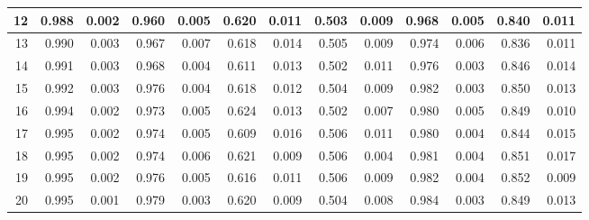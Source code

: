 \documentclass[
]{article}
\begin{document}
\begin{table}[H]
{\begin{tabular}[t]{r|r|r|r|r|r|r|r|r|r|r|r|r}
\hline
12 & 0.988 & 0.002 & 0.960 & 0.005 & 0.620 & 0.011 & 0.503 & 0.009 & 0.968 & 0.005 & 0.840 & 0.011\\
\hline
13 & 0.990 & 0.003 & 0.967 & 0.007 & 0.618 & 0.014 & 0.505 & 0.009 & 0.974 & 0.006 & 0.836 & 0.011\\
\hline
14 & 0.991 & 0.003 & 0.968 & 0.004 & 0.611 & 0.013 & 0.502 & 0.011 & 0.976 & 0.003 & 0.846 & 0.014\\
\hline
15 & 0.992 & 0.003 & 0.976 & 0.004 & 0.618 & 0.012 & 0.504 & 0.009 & 0.982 & 0.003 & 0.850 & 0.013\\
\hline
16 & 0.994 & 0.002 & 0.973 & 0.005 & 0.624 & 0.013 & 0.502 & 0.007 & 0.980 & 0.005 & 0.849 & 0.010\\
\hline
17 & 0.995 & 0.002 & 0.974 & 0.005 & 0.609 & 0.016 & 0.506 & 0.011 & 0.980 & 0.004 & 0.844 & 0.015\\
\hline
18 & 0.995 & 0.002 & 0.974 & 0.006 & 0.621 & 0.009 & 0.506 & 0.004 & 0.981 & 0.004 & 0.851 & 0.017\\
\hline
19 & 0.995 & 0.002 & 0.976 & 0.005 & 0.616 & 0.011 & 0.506 & 0.009 & 0.982 & 0.004 & 0.852 & 0.009\\
\hline
20 & 0.995 & 0.001 & 0.979 & 0.003 & 0.620 & 0.009 & 0.504 & 0.008 & 0.984 & 0.003 & 0.849 & 0.013\\
\hline
\end{tabular}}
\end{table}
\end{document}
